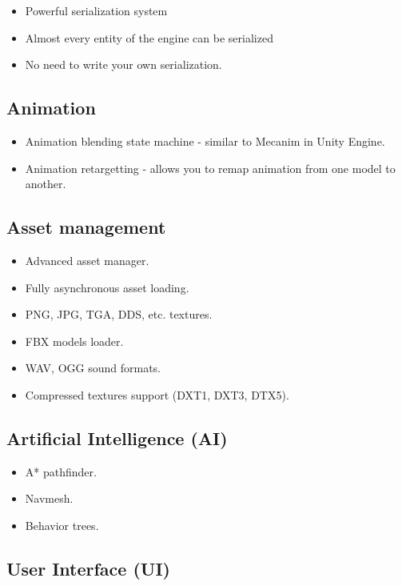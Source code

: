 \documentclass[
]{book}
\providecommand{\tightlist}{%
  \setlength{\itemsep}{0pt}\setlength{\parskip}{0pt}}
\theoremstyle{definition}
\theoremstyle{definition}
\theoremstyle{definition}
\theoremstyle{definition}
\theoremstyle{remark}
\begin{document}
\begin{itemize}
\tightlist
\item
  Powerful serialization system
\item
  Almost every entity of the engine can be serialized
\item
  No need to write your own serialization.
\end{itemize}

\subsection{Animation}\label{animation}

\begin{itemize}
\tightlist
\item
  Animation blending state machine - similar to Mecanim in Unity Engine.
\item
  Animation retargetting - allows you to remap animation from one model to another.
\end{itemize}

\subsection{Asset management}\label{asset-management}

\begin{itemize}
\tightlist
\item
  Advanced asset manager.
\item
  Fully asynchronous asset loading.
\item
  PNG, JPG, TGA, DDS, etc. textures.
\item
  FBX models loader.
\item
  WAV, OGG sound formats.
\item
  Compressed textures support (DXT1, DXT3, DTX5).
\end{itemize}

\subsection{Artificial Intelligence (AI)}\label{artificial-intelligence-ai}

\begin{itemize}
\tightlist
\item
  A* pathfinder.
\item
  Navmesh.
\item
  Behavior trees.
\end{itemize}

\subsection{User Interface (UI)}\label{user-interface-ui}
\end{document}
